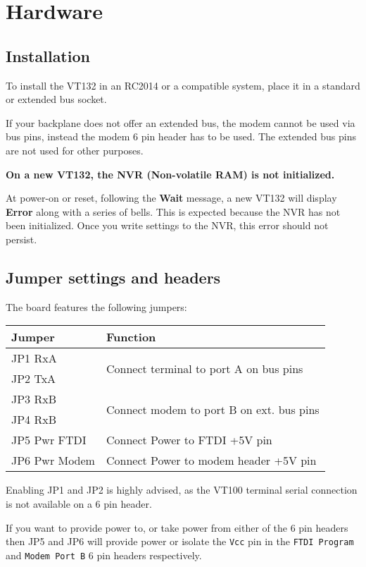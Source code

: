 \appendix

\chapter{Hardware}

\section{Installation}

To install the VT132 in an RC2014 or a compatible system, place it in a standard or extended bus socket.

If your backplane does not offer an extended bus, the modem cannot be used via bus pins, instead the modem 6 pin header has to be used.
The extended bus pins are not used for other purposes.

\textbf{On a new VT132, the NVR (Non-volatile RAM) is not initialized.}

At power-on or reset, following the \textbf{Wait} message, a new VT132 will display \textbf{Error} along with a series of bells.
This is expected because the NVR has not been initialized.
Once you write settings to the NVR, this error should not persist.

\section{Jumper settings and headers}
\label{jumperheaders}

The board features the following jumpers:

\begin{tabular}{p{7em} | p{}}
\hline
\textbf{Jumper} & \textbf{Function} \\
\hline
JP1 RxA & \multirow{2}{*}{Connect terminal to port A on bus pins} \\
JP2 TxA \\
\hline
JP3 RxB & \multirow{2}{*}{Connect modem to port B on ext. bus pins} \\
JP4 RxB \\
\hline
JP5 Pwr FTDI & Connect Power to FTDI +5V pin \\
\hline
JP6 Pwr Modem & Connect Power to modem header +5V pin \\
\hline
\end{tabular}

Enabling JP1 and JP2 is highly advised, as the VT100 terminal serial connection is not available on a 6 pin header.

If you want to provide power to, or take power from either of the 6 pin headers then JP5 and JP6 will provide power
or isolate the \texttt{Vcc} pin in the \texttt{FTDI Program} and \texttt{Modem Port B} 6 pin headers respectively.

